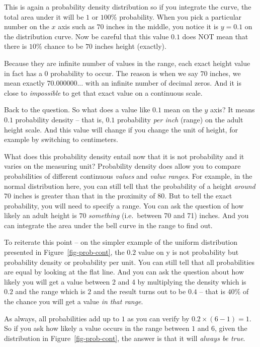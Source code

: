 \documentclass[
  letterpaper,
]{scrbook}
\begin{document}
This is again a probability density distribution so if you integrate the
curve, the total area under it will be \(1\) or \(100\%\) probability.
When you pick a particular number on the \(x\) axis such as \(70\)
inches in the middle, you notice it is \(y = 0.1\) on the distribution
curve. Now be careful that this value \(0.1\) does NOT mean that there
is \(10\%\) chance to be \(70\) inches height (exactly).

Because they are infinite number of values in the range, each exact
height value in fact has a \(0\) probability to occur. The reason is
when we say \(70\) inches, we mean exactly \(70.000000...\) with an
infinite number of decimal zeros. And it is close to \emph{impossible}
to get that exact value on a continuous scale.

Back to the question. So what does a value like \(0.1\) mean on the
\(y\) axis? It means \(0.1\) probability density -- that is, \(0.1\)
probability \emph{per inch} (range) on the adult height scale. And this
value will change if you change the unit of height, for example by
switching to centimeters.

What does this probability density entail now that it is not probability
and it varies on the measuring unit? Probability density does allow you
to compare probabilities of different continuous \emph{values} and
\emph{value ranges}. For example, in the normal distribution here, you
can still tell that the probability of a height \emph{around} \(70\)
inches is greater than that in the proximity of \(80\). But to tell the
exact probability, you will need to specify a range. You can ask the
question of how likely an adult height is \(70\) \emph{something}
(i.e.~between 70 and 71) inches. And you can integrate the area under
the bell curve in the range to find out.

To reiterate this point -- on the simpler example of the uniform
distribution presented in Figure~\ref{fig-prob-cont}, the \(0.2\) value
on y is not probability but probability density or probability per unit.
You can still tell that all probabilities are equal by looking at the
flat line. And you can ask the question about how likely you will get a
value between 2 and 4 by multiplying the density which is \(0.2\) and
the range which is \(2\) and the result turns out to be \(0.4\) -- that
is \(40\%\) of the chance you will get a value \emph{in that range}.

As always, all probabilities add up to \(1\) as you can verify by
\(0.2 \times (6-1) = 1\). So if you ask how likely a value occurs in the
range between \(1\) and \(6\), given the distribution in
Figure~\ref{fig-prob-cont}, the answer is that it will \emph{always be
true}.
\end{document}
